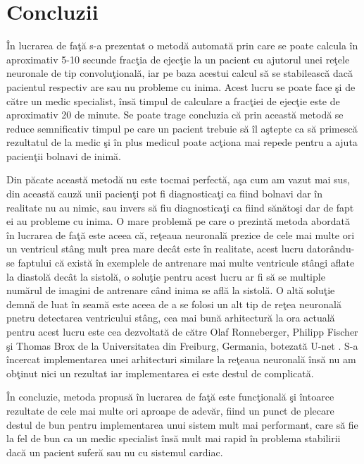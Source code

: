 \chapter{Concluzii}

\^{I}n lucrarea de fa\c{t}\u{a} s-a prezentat o metod\u{a} automat\u{a} prin care se poate calcula \^{i}n aproximativ 5-10 secunde frac\c{t}ia de ejec\c{t}ie la un pacient cu ajutorul unei re\c{t}ele neuronale de tip convolu\c{t}ional\u{a}, iar pe baza acestui calcul s\u{a} se stabileasc\u{a} dac\u{a} pacientul respectiv are sau nu probleme cu inima. Acest lucru se poate face \c{s}i de c\u{a}tre un medic specialist, \^{i}ns\u{a} timpul de calculare a frac\c{t}iei de ejec\c{t}ie este de aproximativ 20 de minute. Se poate trage concluzia c\u{a} prin aceast\u{a} metod\u{a} se reduce semnificativ timpul pe care un pacient trebuie s\u{a} \^{i}l a\c{s}tepte ca s\u{a} primesc\u{a} rezultatul de la medic \c{s}i \^{i}n plus medicul poate ac\c{t}iona mai repede pentru a ajuta pacien\c{t}ii bolnavi de inim\u{a}.

\par

Din p\u{a}cate aceast\u{a} metod\u{a} nu este tocmai perfect\u{a}, a\c{s}a cum am vazut mai sus, din aceast\u{a} cauz\u{a} unii pacien\c{t}i pot fi diagnostica\c{t}i ca fiind bolnavi dar \^{i}n realitate nu au nimic, sau invers s\u{a} fiu diagnostica\c{t}i ca fiind s\u{a}n\u{a}to\c{s}i dar de fapt ei au probleme cu inima. O mare problem\u{a} pe care o prezint\u{a} metoda abordat\u{a} \^{i}n lucrarea de fa\c{t}\u{a} este aceea c\u{a}, re\c{t}eaua neuronal\u{a} prezice de cele mai multe ori un ventricul st\^{a}ng mult prea mare dec\^{a}t este \^{i}n realitate, acest lucru dator\^{a}ndu-se faptului c\u{a} exist\u{a} \^{i}n exemplele de antrenare mai multe ventricule st\^{a}ngi aflate la diastol\u{a} dec\^{a}t la sistol\u{a}, o solu\c{t}ie pentru acest lucru ar fi s\u{a} se multiple num\u{a}rul de imagini de antrenare c\^{a}nd inima se afl\u{a} la sistol\u{a}. O alt\u{a} solu\c{t}ie demn\u{a} de luat \^{i}n seam\u{a} este aceea de a se folosi un alt tip de re\c{t}ea neuronal\u{a} pnetru detectarea ventricului st\^{a}ng, cea mai bun\u{a} arhitectur\u{a} la ora actual\u{a} pentru acest lucru este cea dezvoltat\u{a} de c\u{a}tre Olaf Ronneberger, Philipp Fischer \c{s}i Thomas Brox de la Universitatea din Freiburg, Germania, botezat\u{a} U-net \cite{Unet}. S-a \^{i}ncercat implementarea unei arhitecturi similare la re\c{t}eaua neuronal\u{a} \^{i}ns\u{a} nu am ob\c{t}inut nici un rezultat iar implementarea ei este destul de complicat\u{a}.

\par

\^{I}n concluzie, metoda propus\u{a} \^{i}n lucrarea de fa\c{t}\u{a} este func\c{t}ional\u{a} \c{s}i \^{i}ntoarce rezultate de cele mai multe ori aproape de adev\u{a}r, fiind un punct de plecare destul de bun pentru implementarea unui sistem mult mai performant, care s\u{a} fie la fel de bun ca un medic specialist \^{i}ns\u{a} mult mai rapid \^{i}n problema stabilirii dac\u{a} un pacient sufer\u{a} sau nu cu sistemul cardiac. 